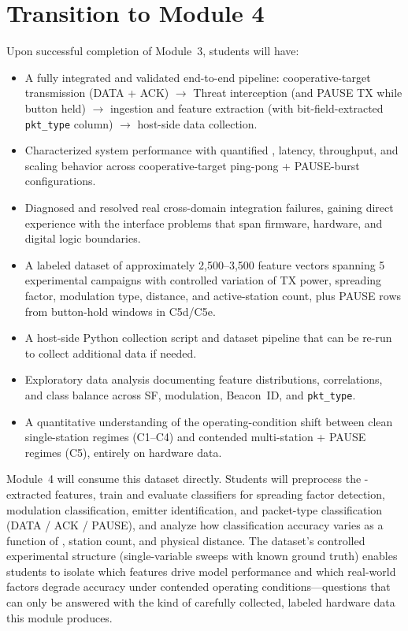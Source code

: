 \documentclass[11pt,letterpaper]{article}
\begin{document}
	\section{Transition to Module 4}

	Upon successful completion of Module~3, students will have:
	\begin{itemize}[leftmargin=2em]
		\item A fully integrated and validated end-to-end pipeline: cooperative-target \RF{} transmission (DATA + ACK) $\rightarrow$ Threat interception (and PAUSE TX while button held) $\rightarrow$ \FPGA{} ingestion and feature extraction (with bit-field-extracted \texttt{pkt\_type} column) $\rightarrow$ host-side data collection.
		\item Characterized system performance with quantified \PER{}, latency, throughput, and scaling behavior across cooperative-target ping-pong + PAUSE-burst configurations.
		\item Diagnosed and resolved real cross-domain integration failures, gaining direct experience with the interface problems that span firmware, hardware, and digital logic boundaries.
		\item A labeled \RF{} dataset of approximately 2{,}500--3{,}500 feature vectors spanning 5 experimental campaigns with controlled variation of TX power, spreading factor, modulation type, distance, and active-station count, plus PAUSE rows from button-hold windows in C5d/C5e.
		\item A host-side Python collection script and dataset pipeline that can be re-run to collect additional data if needed.
		\item Exploratory data analysis documenting feature distributions, correlations, and class balance across SF, modulation, Beacon~ID, and \texttt{pkt\_type}.
		\item A quantitative understanding of the operating-condition shift between clean single-station regimes (C1--C4) and contended multi-station + PAUSE regimes (C5), entirely on hardware data.
	\end{itemize}

	Module~4 will consume this dataset directly. Students will preprocess the \FPGA{}-extracted features, train and evaluate classifiers for spreading factor detection, modulation classification, emitter identification, and packet-type classification (DATA / ACK / PAUSE), and analyze how classification accuracy varies as a function of \SNR{}, station count, and physical distance. The dataset's controlled experimental structure (single-variable sweeps with known ground truth) enables students to isolate which features drive model performance and which real-world factors degrade accuracy under contended operating conditions---questions that can only be answered with the kind of carefully collected, labeled hardware data this module produces.
\end{document}
